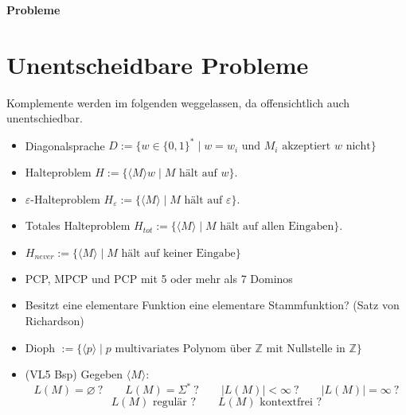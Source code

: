 \documentclass[a4paper,graphics,11pt]{article}
\newcommand{\eps}[0]{\varepsilon}
\newcommand{\godel}[1]{\langle #1 \rangle}
\begin{document}
\begin{center}
    \LARGE \textbf{Probleme}
\end{center}

\section*{Unentscheidbare Probleme}

Komplemente werden im folgenden weggelassen, da offensichtlich auch unentschiedbar.
\begin{itemize}
    \item Diagonalsprache $D := \{w \in \{0,1\}^* \mid w = w_i \text{ und } M_i \text{ akzeptiert } w \text{ nicht}\}$
    \\
\item Halteproblem $H := \{\godel{M} w \mid M \text{ hält auf } w\}$.
\item $\eps$-Halteproblem $H_\eps := \{\godel{M} \mid M \text{ hält auf } \eps \}$.
    \item Totales Halteproblem $H_{tot} := \{\godel{M} \mid M \text{ hält auf allen Eingaben}\}$.
    \item $H_{never} := \{\godel{M} \mid M \text{ hält auf keiner Eingabe}\}$
    \\
    \item PCP, MPCP und PCP mit 5 oder mehr als 7 Dominos
    \\
    \item Besitzt eine elementare Funktion eine elementare Stammfunktion? (Satz von Richardson)
    \item Dioph $:= \{\godel{p} \mid p \text{ multivariates Polynom über $\mathbb{Z}$ mit Nullstelle in $\mathbb{Z}$}\}$
    \\
    \item (VL5 Bsp) Gegeben $\godel{M}$:
        $$
            L(M) = \varnothing\ ?
            \qquad
            L(M) = \Sigma^*\ ?
            \qquad
            |L(M)| < \infty\ ?
            \qquad
            |L(M)| = \infty\ ?
        $$
        $$
            L(M) \text{ regulär ?}
            \qquad
            L(M) \text{ kontextfrei ?}
        $$
\end{itemize}
\end{document}

